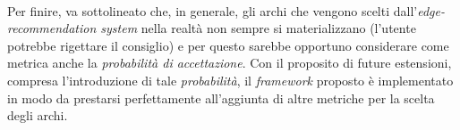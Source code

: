 \documentclass[trieste,12pt]{toptesi}
\makeatletter
\newcommand\listofcodes{%
 \iffrontmatter\else\frontmattertrue\fi
 \if@openright\cleardoublepage\else\clearpage\fi
 \begingroup\def\chapter##1{\@schapter}
 \phantomsection %
 \lstlistoflistings 
 \endgroup
}
\makeatother
\begin{document}
\\Per finire, va sottolineato che, in generale, gli archi che vengono scelti dall'\textit{edge-recommendation system} nella realtà non sempre si materializzano (l'utente potrebbe rigettare il consiglio) e per questo sarebbe opportuno considerare come metrica anche la \textit{probabilità di accettazione}. Con il proposito di future estensioni, compresa l'introduzione di tale \textit{probabilità}, il \textit{framework} proposto è implementato in modo da prestarsi perfettamente all'aggiunta di altre metriche per la scelta degli archi.





\tableofcontents

\listoffigures




\mainmatter


%






%
%

\nocite{*}
\printbibliography
\end{document}
